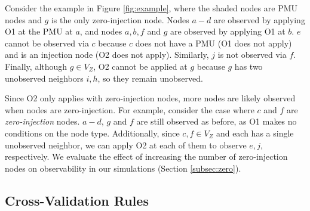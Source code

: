 Consider the example in Figure \ref{fig:example}, where the shaded nodes are PMU nodes and $g$ is the only zero-injection node. 
Nodes $a-d$ are observed by applying O1 at the PMU at $a$, and nodes $a,b,f$ and $g$ are observed by applying O1 at $b$. 
$e$ cannot be observed via $c$ because $c$ does not have a PMU (O1 does not apply) and is an injection node (O2 does not apply). %
Similarly, $j$ is not observed via $f$. Finally, although $g \in V_Z$, O2 cannot be applied at $g$ because $g$ has two unobserved neighbors $i,h$, so they remain unobserved.

Since O2 only applies with zero-injection nodes, more nodes are likely observed when nodes are zero-injection. For example, consider the case where $c$ and $f$ are {\em zero-injection} nodes. $a-d$, $g$ and $f$ are still observed as before, as O1 makes no 
conditions on the node type. Additionally, 
since $c,f \in V_Z$ and each has a single unobserved neighbor,  we can apply O2 at each of them to observe $e,j$, respectively. %
We evaluate the effect of increasing the number of zero-injection nodes on observability in our simulations (Section \ref{subsec:zero}).






\subsection{Cross-Validation Rules}
\label{subsec:xval-rules}

